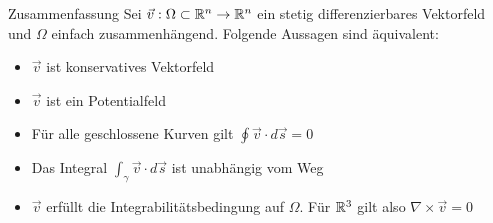 \begin{Diverses}{Zusammenfassung}{}
	Sei $\vec{v} : \Omega \subset \mathbb{R}^n \to \mathbb{R}^n$ ein stetig differenzierbares Vektorfeld und $\Omega$ einfach zusammenhängend. Folgende Aussagen sind äquivalent:
	\begin{itemize}
		\item $\vec{v}$ ist konservatives Vektorfeld
		\item $\vec{v}$ ist ein Potentialfeld
		\item Für alle geschlossene Kurven gilt $\oint \vec{v} \cdot d\vec{s} = 0$
		\item Das Integral $\int_\gamma \vec{v} \cdot d\vec{s}$ ist unabhängig vom Weg
		\item $\vec{v}$ erfüllt die Integrabilitätsbedingung auf $\Omega$. Für $\mathbb{R}^3$ gilt also $\nabla \times \vec{v} = 0$
	\end{itemize}
\end{Diverses}
